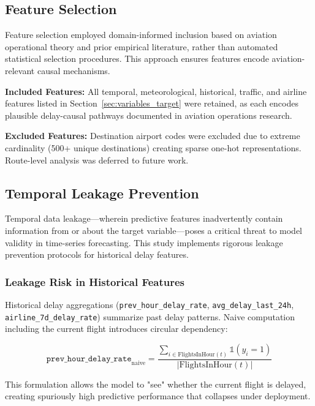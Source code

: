 \documentclass{report}
\begin{document}
\subsection{Feature Selection}
\label{sec:feature_selection}

Feature selection employed domain-informed inclusion based on aviation operational theory and prior empirical literature, rather than automated statistical selection procedures. This approach ensures features encode aviation-relevant causal mechanisms.

\textbf{Included Features:} All temporal, meteorological, historical, traffic, and airline features listed in Section~\ref{sec:variables_target} were retained, as each encodes plausible delay-causal pathways documented in aviation operations research.

\textbf{Excluded Features:} Destination airport codes were excluded due to extreme cardinality (500+ unique destinations) creating sparse one-hot representations. Route-level analysis was deferred to future work.

\subsection{Temporal Leakage Prevention}
\label{sec:leakage}

Temporal data leakage—wherein predictive features inadvertently contain information from or about the target variable—poses a critical threat to model validity in time-series forecasting. This study implements rigorous leakage prevention protocols for historical delay features.

\subsubsection{Leakage Risk in Historical Features}

Historical delay aggregations (\texttt{prev\_hour\_delay\_rate}, \texttt{avg\_delay\_last\_24h}, \texttt{airline\_7d\_delay\_rate}) summarize past delay patterns. Naive computation including the current flight introduces circular dependency:

\begin{equation}
\texttt{prev\_hour\_delay\_rate}_{\text{naive}} = \frac{\sum_{i \in \text{FlightsInHour}(t)} \mathbb{1}(y_i = 1)}{|\text{FlightsInHour}(t)|}
\end{equation}

This formulation allows the model to "see" whether the current flight is delayed, creating spuriously high predictive performance that collapses under deployment.
\end{document}
